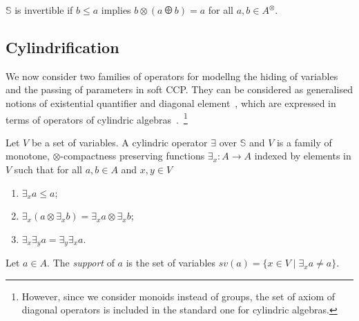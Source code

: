 \documentclass[main.tex]{subfiles}
\begin{document}
\begin{definition}
${\mathbb S}$ is invertible if
$b \leq a$ implies $b \otimes (a \odiv b) = a$
for all $a, b \in A^\otimes$.
\end{definition}


\subsection{Cylindrification}
We now consider two families of operators for modellng
the hiding of variables and the passing of parameters in soft CCP.
%
They can be considered as generalised notions of existential quantifier
and diagonal element~\cite{popl91}, which are expressed in terms of operators 
of cylindric algebras~\cite{monk}.~\footnote{However, since we consider monoids instead of groups, 
the set of axiom of diagonal operators is included in the standard one for cylindric algebras.}


\begin{definition}[Cylindrification]
Let $V$ be a set of variables.
%
A cylindric operator $\exists$ over ${\mathbb S}$ and $V$ is a family of monotone, 
$\otimes$-compactness preserving functions
$\exists_x: A \rightarrow A$ indexed by elements in $V$ such that for all $a, b \in A$ and $x, y \in V$
\begin{enumerate}
 \item $\exists_x a \leq a$;
 \item $\exists_x(a \otimes \exists_x b) = \exists_x a \otimes \exists_x b$; 
 \item $\exists_x\exists_y a = \exists_y\exists_x a$.
 \end{enumerate}

\noindent Let $a \in A$. The \emph{support} of $a$ is the set of variables $sv(a) = \{ x \in V \mid \exists_x a \neq a\}$. 
\end{definition}

%
\end{document}
